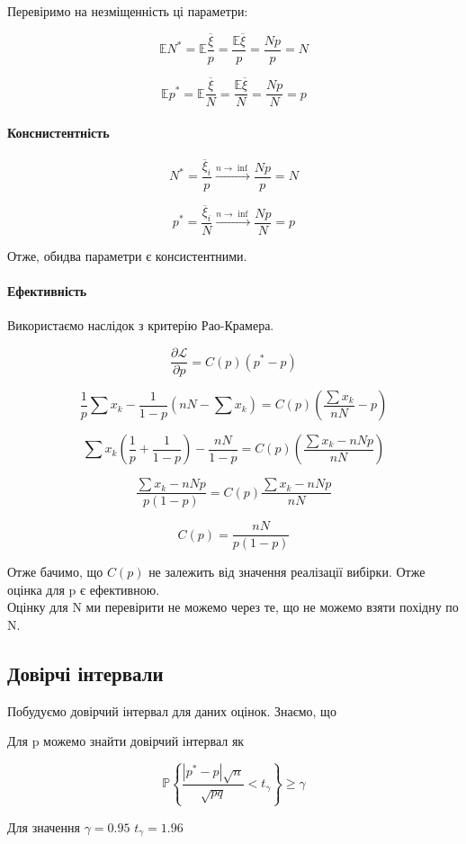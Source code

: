 \documentclass{article}
\begin{document}
Перевіримо на незміщенність ці параметри:

$$
\mathbb{E}N^* =\mathbb{E} \frac{\overline\xi}{p} =\frac{\mathbb{E}\overline\xi}{p} = \frac{Np}{p} =
N
$$

$$
\mathbb{E}p^* =\mathbb{E} \frac{\overline\xi}{N} =\frac{\mathbb{E}\overline\xi}{N} = \frac{Np}{N} =
p
$$
\paragraph{Конснистентність}

$$
N^* = \frac{\overline\xi_i}{p} \xrightarrow{n\rightarrow\inf} \frac{Np}{p} = N
$$


$$
p^* = \frac{\overline\xi_i}{N} \xrightarrow{n\rightarrow\inf} \frac{Np}{N} = p
$$

Отже, обидва параметри є консистентними.
\paragraph{Ефективність}
Використаємо наслідок з критерію Рао-Крамера. 

$$
\frac{\partial \mathcal{L}}{\partial p} = C(p) (p^* - p)
$$

$$
\frac{1}{p}\sum x_k - \frac{1}{1-p} \left(nN - \sum x_k\right) = C(p) \left(\frac{\sum x_k}{nN} -
p\right)
$$

$$
\sum x_k \left( \frac{1}{p} + \frac{1}{1-p}  \right) - \frac{nN}{1-p} = C(p) \left(\frac{ \sum x_k -
nNp}{nN} \right)
$$

$$
\frac{\sum x_k - nNp}{p(1-p)} = C(p) \frac{\sum x_k - nNp}{nN}
$$

$$
C(p) = \frac{nN}{p(1-p)}
$$

Отже бачимо, що $C(p)$ не залежить від значення реалізації вибірки. Отже оцінка для p є
ефективною.\\

Оцінку для N ми перевірити не можемо через те, що не можемо взяти похідну по N.



\subsection{Довірчі інтервали}
Побудуємо довірчий інтервал для даних оцінок. Знаємо, що

Для p можемо знайти довірчий інтервал як 

$$
\mathbb{P} \left\{\frac{ | p^* - p | \sqrt{n} } {\sqrt{pq}} < t_\gamma \right\} \geq \gamma
$$

Для значення $\gamma=0.95$ $t_\gamma = 1.96$  
\end{document}
